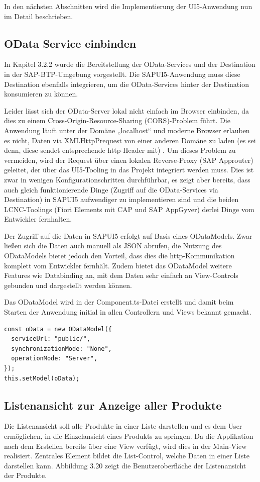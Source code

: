 In den nächsten Abschnitten wird die Implementierung der UI5-Anwendung nun im Detail beschrieben. 

\subsection{OData Service einbinden}

In Kapitel 3.2.2 wurde die Bereitstellung der OData-Services und der Destination in der SAP-BTP-Umgebung vorgestellt. Die SAPUI5-Anwendung muss diese Destination ebenfalls integrieren, um die OData-Services hinter der Destination konsumieren zu können. 

Leider lässt sich der OData-Server lokal nicht einfach im Browser einbinden, da dies zu einem Cross-Origin-Resource-Sharing (CORS)-Problem führt. Die Anwendung läuft unter der Domäne „localhost“ und moderne Browser erlauben es nicht, Daten via XMLHttpPrequest von einer anderen Domäne zu laden (es sei denn, diese sendet entsprechende http-Header mit) \cite{sud:s25}. Um dieses Problem zu vermeiden, wird der Request über einen lokalen Reverse-Proxy (SAP Approuter) geleitet, der über das UI5-Tooling in das Projekt integriert werden muss. Dies ist zwar in wenigen Konfigurationschritten durchführbar, es zeigt aber bereits, dass auch gleich funktionierende Dinge (Zugriff auf die OData-Services via Destination) in SAPUI5 aufwendiger zu implementieren sind und die beiden LCNC-Toolings (Fiori Elements mit CAP und SAP AppGyver) derlei Dinge vom Entwickler fernhalten.

Der Zugriff auf die Daten in SAPUI5 erfolgt auf Basis eines ODataModels. Zwar ließen sich die Daten auch manuell als JSON abrufen, die Nutzung des ODataModels bietet jedoch den Vorteil, dass dies die http-Kommunikation komplett vom Entwickler fernhält. Zudem bietet das ODataModel weitere Features wie Databinding an, mit dem Daten sehr einfach an View-Controls gebunden und dargestellt werden können. 

Das ODataModel wird in der Component.ts-Datei erstellt und damit beim Starten der Anwendung initial in allen Controllern und Views bekannt gemacht.

\begin{lstlisting}[emph={oData},  caption=Auszüge aus der Klasse \texttt{Component}]
const oData = new ODataModel({
  serviceUrl: "public/",
  synchronizationMode: "None",
  operationMode: "Server",
});
this.setModel(oData);
\end{lstlisting}

\subsection{Listenansicht zur Anzeige aller Produkte}
Die Listenansicht soll alle Produkte in einer Liste darstellen und es dem User ermöglichen, in die Einzelansicht eines Produkts zu springen. Da die Applikation nach dem Erstellen bereits über eine View verfügt, wird dies in der Main-View realisiert. Zentrales Element bildet die List-Control, welche Daten in einer Liste darstellen kann. Abbildung 3.20 zeigt die Benutzeroberfläche der Listenansicht der Produkte.

